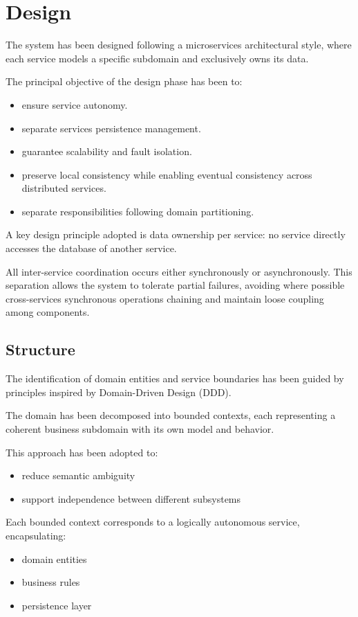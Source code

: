 \section{Design}

The system has been designed following a microservices architectural style, where each service models a specific subdomain and exclusively owns its data.

The principal objective of the design phase has been to:
\begin{itemize}
  \item ensure service autonomy.
  \item separate services persistence management.
  \item guarantee scalability and fault isolation.
  \item preserve local consistency while enabling eventual consistency across distributed services.
  \item separate responsibilities following domain partitioning.
\end{itemize}

A key design principle adopted is data ownership per service: no service directly accesses the database of another service.

All inter-service coordination occurs either synchronously or asynchronously.
This separation allows the system to tolerate partial failures, avoiding where possible cross-services synchronous operations chaining and maintain loose coupling among components.

\subsection{Structure}

The identification of domain entities and service boundaries has been guided by principles inspired by Domain-Driven Design (DDD).

The domain has been decomposed into bounded contexts, each representing a coherent business subdomain with its own model and behavior.

This approach has been adopted to:
\begin{itemize}
  \item reduce semantic ambiguity
  \item support independence between different subsystems
\end{itemize}

Each bounded context corresponds to a logically autonomous service, encapsulating:
\begin{itemize}
  \item domain entities
  \item business rules
  \item persistence layer
\end{itemize}

